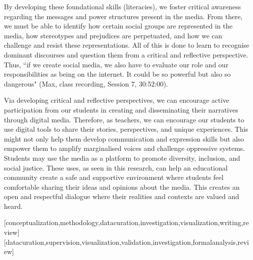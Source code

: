 \documentclass[english]{textolivre}
\begin{document}
By developing these foundational skills (literacies), we foster critical awareness regarding the messages and power structures present in the media. From there, we must be able to identify how certain social groups are represented in the media, how stereotypes and prejudices are perpetuated, and how we can challenge and resist these representations. All of this is done to learn to recognise dominant discourses and question them from a critical and reflective perspective. Thus, “if we create social media, we also have to evaluate our role and our responsibilities as being on the internet. It could be so powerful but also so dangerous" (Max, class recording, Session 7, 30:52:00).

Via developing critical and reflective perspectives, we can encourage active participation from our students in creating and disseminating their narratives through digital media. Therefore, as teachers, we can encourage our students to use digital tools to share their stories, perspectives, and unique experiences. This might not only help them develop communication and expression skills but also empower them to amplify marginalised voices and challenge oppressive systems. Students may use the media as a platform to promote diversity, inclusion, and social justice. These uses, as seen in this research, can help an educational community create a safe and supportive environment where students feel comfortable sharing their ideas and opinions about the media. This creates an open and respectful dialogue where their realities and contexts are valued and heard.


\printbibliography\label{sec-bib}


\begin{contributors}
[conceptualization,methodology,datacuration,investigation,visualization,writing,review]
[datacuration,supervision,visualization,validation,investigation,formalanalysis,review]
\end{contributors}
\end{document}
